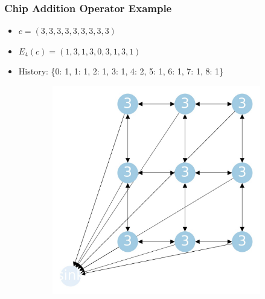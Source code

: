 \documentclass{beamer}
\begin{document}
\begin{frame}
\frametitle{Chip Addition Operator Example}
  \begin{itemize}
    \item $c = (3,3,3,3,3,3,3,3,3)$
    \item $E_4(c) = (1,3,1,3,0,3,1,3,1)$
    \item History: \{0: 1, 1: 1, 2: 1, 3: 1, 4: 2, 5: 1, 6: 1, 7: 1, 8: 1\}
  \end{itemize}

  \begin{figure}[h!]
    \centering
    \begin{subfigure}[b]{0.4\linewidth}
      \includegraphics[width=\linewidth]{sandpile_chip_fire_0}
    \end{subfigure}
    \begin{subfigure}[b]{0.4\linewidth}

\end{subfigure}
\end{figure}
\end{frame}
\end{document}
